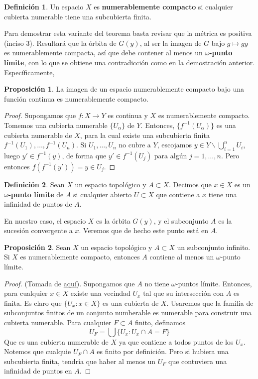 \documentclass[spanish]{article}
\theoremstyle{definition}
\newtheorem*{defn}{Definición}
\newtheorem*{prop}{Proposición}
\begin{document}
\begin{defn}
	Un espacio $X$ es \textbf{numerablemente compacto} si cualquier cubierta numerable tiene una subcubierta finita.
\end{defn}

Para demostrar esta variante del teorema basta revisar que la métrica es positiva (inciso 3). Resultará que la órbita de $G(y)$, al ser la imagen de $G$ bajo $g\mapsto gy$ es numerablemente compacta, así que debe contener al menos un $\omega$\textbf{-punto límite}, con lo que se obtiene una contradicción como en la demostración anterior. Específicamente,
\begin{prop}
	La imagen de un espacio numerablemente compacto bajo una función continua es numerablemente compacto.
\end{prop}
\begin{proof}
	Supongamos que $f:X\to Y$ es continua y $X$ es numerablemente compacto. Tomemos una cubierta numerable $\{U_\alpha\}$ de $Y$. Entonces, $\{f^{-1}(U_\alpha)\}$ es una cubierta numerable de $X$, para la cual existe una subcubierta finita $f^{-1}(U_1),\ldots,f^{-1}(U_n)$. Si $U_1,\ldots,U_n$ no cubre a $Y$, escojamos $y\in Y\backslash\bigcup_{i=1}^nU_i$, luego $y'\in f^{-1}(y)$, de forma que $y'\in f^{-1}(U_j)$ para algún $j=1,\ldots,n$. Pero entonces $f(f^{-1}(y'))=y\in U_j$.
\end{proof}
\begin{defn}
	Sean $X$ un espacio topológico y $A\subset X$. Decimos que $x\in X$ es un \textbf{$\omega$-punto límite} de $A$ si cualquier abierto $U\subset X$ que contiene a $x$ tiene una infinidad de puntos de $A$.
\end{defn}
En nuestro caso, el espacio $X$ es la órbita $G(y)$, y el subconjunto $A$ es la sucesión convergente a $x$. Veremos que de hecho este punto está en $A$.
\begin{prop}\label{prop:num-comp}
	Sean $X$ un espacio topológico y $A\subset X$ un subconjunto infinito. Si $X$ es numerablemente compacto, entonces $A$ contiene al menos un $\omega$-punto límite.
\end{prop}
\begin{proof}
	(Tomada de \href{https://math.stackexchange.com/questions/1817245/a-topological-space-is-countably-compact-iff-every-countably-infinite-subset-has}{aquí}).
	Supongamos que $A$ no tiene $\omega$-puntos límite. Entonces, para cualquier $x\in X$ existe una vecindad $U_x$ tal que su intersección con $A$ es finita. Es claro que $\{U_x:x\in X\}$ es una cubierta de $X$. Usaremos que la familia de subconjuntos finitos de un conjunto numberable es numerable para construir una cubierta numerable. Para cualquier $F\subset A$ finito, definamos \[U_F=\bigcup\{U_x:U_x\cap A=F\}\]
	Que es una cubierta numerable de $X$ ya que contiene a todos puntos de los $U_x$. Notemos que cualquie $U_F\cap A$ es finito por definición. Pero si hubiera una subcubierta finita, tendría que haber al menos un $U_F$ que contuviera una infinidad de puntos en $A$.
\end{proof}
\end{document}
